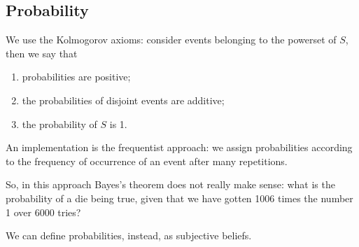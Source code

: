 \documentclass[main.tex]{subfiles}
\begin{document}

\subsection{Probability}

We use the Kolmogorov axioms: consider events belonging to the powerset of \(S\), then we say that 
\begin{enumerate}
    \item probabilities are positive;
    \item the probabilities of disjoint events are additive;
    \item the probability of \(S\) is 1.
\end{enumerate}

An implementation is the frequentist approach: we assign probabilities according to the frequency of occurrence of an event after many repetitions. 

So, in this approach Bayes's theorem does not really make sense: what is the probability of a die being true, given that we have gotten 1006 times the number 1 over 6000 tries?

We can define probabilities, instead, as subjective beliefs. 
\end{document}
